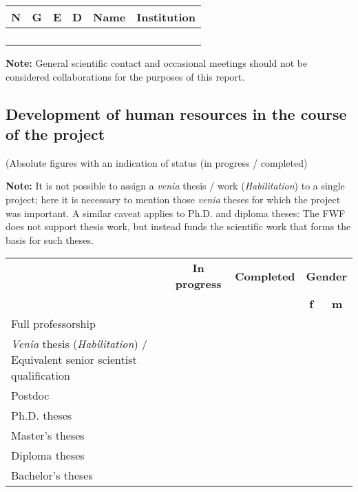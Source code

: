 \documentclass[a4paper, 11pt]{article}
\begin{document}
\begin{tabular}{|c|c|c|c|l|l|}
\multicolumn{1}{c}{\textbf{N}} &
\multicolumn{1}{c}{\textbf{G}} &
\multicolumn{1}{c}{\textbf{E}} &
\multicolumn{1}{c}{\textbf{D}} &
\multicolumn{1}{c}{\textbf{Name}} &
\multicolumn{1}{c}{\textbf{Institution}} \\
\hline
 & & & & & \\
\hline
 & & & & & \\
\hline
 & & & & & \\
\hline
 & & & & & \\
\hline
\end{tabular}
 
\textbf{Note:} General scientific contact and occasional meetings should not be
considered collaborations for the purposes of this report.

\subsection{Development of human resources in the course of the project}

(Absolute figures with an indication of status (in progress / completed)

\textbf{Note:} It is not possible to assign a \emph{venia} thesis / work
(\emph{Habilitation})
to a single project; here it is necessary to mention those \emph{venia} theses for
which the project was important.  A similar caveat applies to Ph.D. and diploma
theses: The FWF does not support thesis work, but instead funds the scientific
work that forms the basis for such theses.

\begin{tabular}{|p{8cm}|c|c|p{0.5cm}|p{0.5cm}|}
\multicolumn{1}{c}{} &
\multicolumn{1}{c}{\textbf{In progress}} &
\multicolumn{1}{c}{\textbf{Completed}} &
\multicolumn{2}{c}{\textbf{Gender}} \\
\multicolumn{3}{c}{} &
\multicolumn{1}{c}{\textbf{f}} &
\multicolumn{1}{c}{\textbf{m}} \\
\hline
Full professorship & & & & \\
\hline
\emph{Venia} thesis (\emph{Habilitation}) / \newline
Equivalent senior scientist qualification & & & & \\
\hline
Postdoc & & & & \\
\hline
Ph.D. theses & & & & \\
\hline
Master's theses & & & & \\
\hline
Diploma theses & & & & \\
\hline
Bachelor's theses & & & & \\
\hline
\end{tabular}
\end{document}
